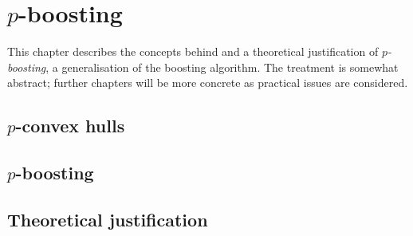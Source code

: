 

\chapter{$p$-boosting}

This chapter describes the concepts behind and a theoretical
justification of \emph{$p$-boosting}, a generalisation of the boosting
algorithm.  The treatment is somewhat abstract; further chapters will
be more concrete as practical issues are considered.

\section{$p$-convex hulls}

\section{$p$-boosting}

\section{Theoretical justification}


